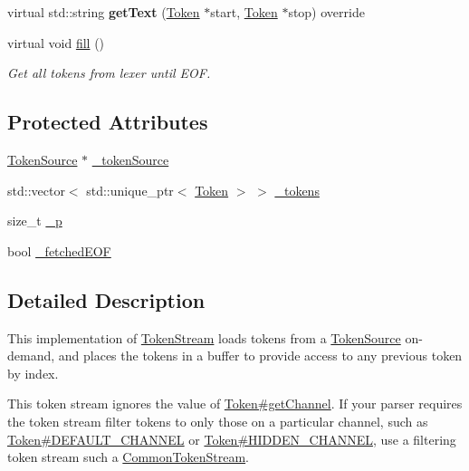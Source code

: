\begin{DoxyCompactItemize}
virtual std\+::string {\bfseries get\+Text} (\hyperlink{classantlr4_1_1Token}{Token} $\ast$start, \hyperlink{classantlr4_1_1Token}{Token} $\ast$stop) override
\item 
\mbox{\label{classantlr4_1_1BufferedTokenStream_a373c27c4d4ec7358ba6985f4839e988a}} 
virtual void \hyperlink{classantlr4_1_1BufferedTokenStream_a373c27c4d4ec7358ba6985f4839e988a}{fill} ()
\begin{DoxyCompactList}\small\item\em Get all tokens from lexer until E\+OF. \end{DoxyCompactList}\end{DoxyCompactItemize}
\subsection*{Protected Attributes}
\begin{DoxyCompactItemize}
\item 
\hyperlink{classantlr4_1_1TokenSource}{Token\+Source} $\ast$ \hyperlink{classantlr4_1_1BufferedTokenStream_aa0a28e43e9e3329ddfe404804f726023}{\+\_\+token\+Source}
\item 
std\+::vector$<$ std\+::unique\+\_\+ptr$<$ \hyperlink{classantlr4_1_1Token}{Token} $>$ $>$ \hyperlink{classantlr4_1_1BufferedTokenStream_ac681a8540466ec9aab6cff49bbcbdb4b}{\+\_\+tokens}
\item 
size\+\_\+t \hyperlink{classantlr4_1_1BufferedTokenStream_aa8ab272f9ef3f5195ef8aeb4da15f9ca}{\+\_\+p}
\item 
bool \hyperlink{classantlr4_1_1BufferedTokenStream_a400797b54a3d7d151aa0ace27e766e8e}{\+\_\+fetched\+E\+OF}
\end{DoxyCompactItemize}


\subsection{Detailed Description}
This implementation of \hyperlink{}{Token\+Stream} loads tokens from a \hyperlink{classantlr4_1_1TokenSource}{Token\+Source} on-\/demand, and places the tokens in a buffer to provide access to any previous token by index.

This token stream ignores the value of \hyperlink{classantlr4_1_1Token_a92991c0566e4cb00ae2c5f9e7d8fe6b4}{Token\#get\+Channel}. If your parser requires the token stream filter tokens to only those on a particular channel, such as \hyperlink{classantlr4_1_1Token_a699cbc56affbddc079561e175cba8435}{Token\#\+D\+E\+F\+A\+U\+L\+T\+\_\+\+C\+H\+A\+N\+N\+EL} or \hyperlink{classantlr4_1_1Token_af9bee187eba93f908d76d6406883424a}{Token\#\+H\+I\+D\+D\+E\+N\+\_\+\+C\+H\+A\+N\+N\+EL}, use a filtering token stream such a \hyperlink{classantlr4_1_1CommonTokenStream}{Common\+Token\+Stream}.


